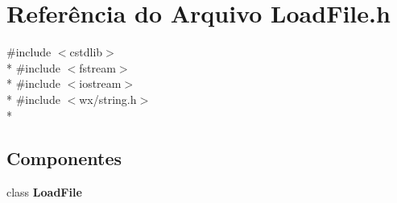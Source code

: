 \section{Referência do Arquivo Load\+File.\+h}
\label{_load_file_8h}
{\ttfamily \#include $<$cstdlib$>$}\\*
{\ttfamily \#include $<$fstream$>$}\\*
{\ttfamily \#include $<$iostream$>$}\\*
{\ttfamily \#include $<$wx/string.\+h$>$}\\*
\subsection*{Componentes}
\begin{DoxyCompactItemize}
\item 
class {\bf Load\+File}
\end{DoxyCompactItemize}
